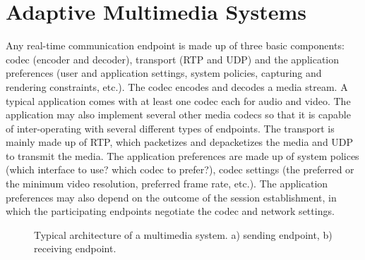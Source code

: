 \section{Adaptive Multimedia Systems}
\label{fw.amusys}

Any real-time communication endpoint is made up of three basic components:
codec (encoder and decoder), transport (RTP and UDP) and the application
preferences (user and application settings, system policies, capturing and
rendering constraints, etc.). The codec encodes and decodes a media stream. A
typical application comes with at least one codec each for audio and video. 
The application may also implement several other media codecs so that 
it is capable of inter-operating
with several different types of endpoints. The transport is mainly made up of
RTP, which packetizes and depacketizes the media and UDP to transmit the
media. The application preferences are made up of system polices (which
interface to use? which codec to prefer?), codec settings (the
preferred or the minimum video resolution, preferred frame rate, etc.). The
application preferences may also depend on the outcome of the session
establishment, in which the participating endpoints negotiate the codec and
network settings.

\begin{figure}
  \centerline{
  }
  \centerline{
  }
  
  \caption{Typical architecture of a multimedia system. a) sending endpoint,
  b) receiving endpoint.}
  \label{fig:4:appint}
\end{figure}


